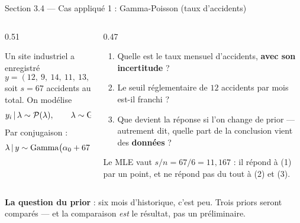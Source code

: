 
\begin{frame}{Section 3.4 --- Cas appliqué 1 : Gamma-Poisson (taux d'accidents)}
\begin{columns}[t]
\begin{column}{0.51\textwidth}
\begin{ebox}[Énoncé]
Un site industriel a enregistré
\[
y = (12,\ 9,\ 14,\ 11,\ 13,\ 8) \quad\text{accidents sur 6 mois},
\]
soit $s = 67$ accidents au total. On modélise
\[
y_i \,\vert\, \lambda \sim \mathcal{P}(\lambda),
\qquad
\lambda \sim \mathrm{Gamma}(\alpha_0\,; \beta_0).
\]
Par conjugaison :
\[
\lambda \,\vert\, y \sim \mathrm{Gamma}\big(\alpha_0 + 67\,;\, \beta_0 + 6\big).
\]
\end{ebox}
\end{column}
\begin{column}{0.47\textwidth}
\begin{kbox}
\begin{enumerate}
  \item Quelle est le taux mensuel d'accidents, \textbf{avec son incertitude} ?
  \item Le seuil réglementaire de $12$ accidents par mois est-il franchi ?
  \item Que devient la réponse si l'on change de prior --- autrement dit,
        quelle part de la conclusion vient des \textbf{données} ?
\end{enumerate}
\vspace{1mm}
\footnotesize Le MLE vaut $s/n = 67/6 = 11{,}167$ : il répond à (1) par un point,
et ne répond pas du tout à (2) et (3).
\end{kbox}
\end{column}
\end{columns}
\vspace{1mm}
\begin{tcolorbox}[colback=byCyan!8,colframe=byCyan,arc=2mm,width=.95\textwidth]
\centering\small
\textbf{La question du prior} : six mois d'historique, c'est peu. Trois priors
seront comparés --- et la comparaison \emph{est} le résultat, pas un préliminaire.
\end{tcolorbox}
\end{frame}

